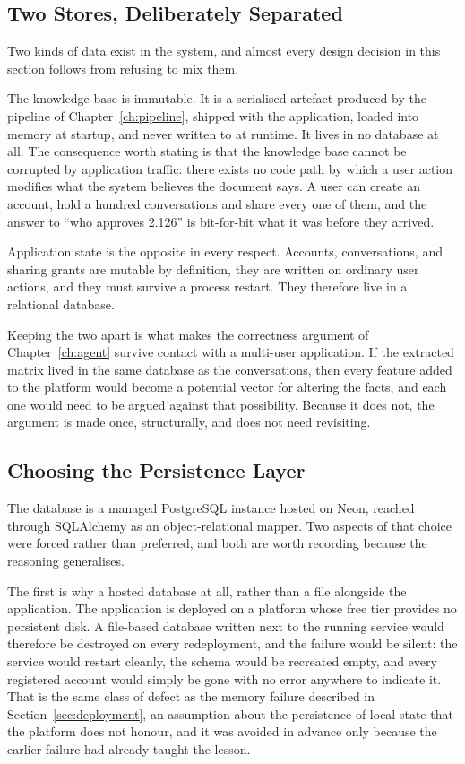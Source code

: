 \subsection{Two Stores, Deliberately Separated}

Two kinds of data exist in the system, and almost every design decision in this section
follows from refusing to mix them.

The knowledge base is immutable. It is a serialised artefact produced by the pipeline of
Chapter~\ref{ch:pipeline}, shipped with the application, loaded into memory at startup, and
never written to at runtime. It lives in no database at all. The consequence worth stating
is that the knowledge base cannot be corrupted by application traffic: there exists no code
path by which a user action modifies what the system believes the document says. A user can
create an account, hold a hundred conversations and share every one of them, and the answer
to ``who approves 2.126'' is bit-for-bit what it was before they arrived.

Application state is the opposite in every respect. Accounts, conversations, and sharing
grants are mutable by definition, they are written on ordinary user actions, and they must
survive a process restart. They therefore live in a relational database.

Keeping the two apart is what makes the correctness argument of Chapter~\ref{ch:agent}
survive contact with a multi-user application. If the extracted matrix lived in the same
database as the conversations, then every feature added to the platform would become a
potential vector for altering the facts, and each one would need to be argued against that
possibility. Because it does not, the argument is made once, structurally, and does not need
revisiting.

\subsection{Choosing the Persistence Layer}

The database is a managed PostgreSQL instance hosted on Neon, reached through SQLAlchemy as
an object-relational mapper. Two aspects of that choice were forced rather than preferred,
and both are worth recording because the reasoning generalises.

The first is why a hosted database at all, rather than a file alongside the application. The
application is deployed on a platform whose free tier provides no persistent disk. A
file-based database written next to the running service would therefore be destroyed on
every redeployment, and the failure would be silent: the service would restart cleanly, the
schema would be recreated empty, and every registered account would simply be gone with no
error anywhere to indicate it. That is the same class of defect as the memory failure
described in Section~\ref{sec:deployment}, an assumption about the persistence of local
state that the platform does not honour, and it was avoided in advance only because the
earlier failure had already taught the lesson.


